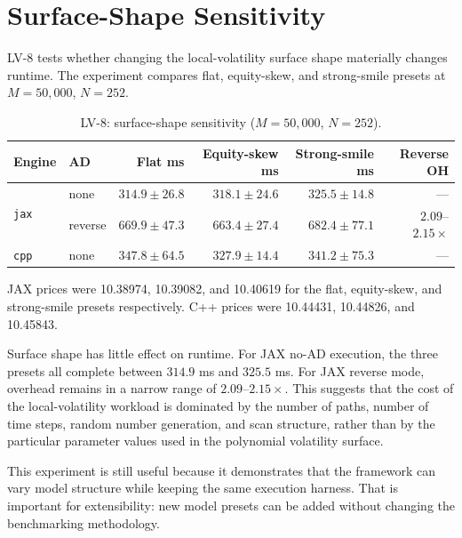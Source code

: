\section{Surface-Shape Sensitivity}
\label{sec:results-surface-sensitivity}

LV-8 tests whether changing the local-volatility surface shape materially
changes runtime.  The experiment compares flat, equity-skew, and
strong-smile presets at \(M=50{,}000\), \(N=252\).

\begin{table}[htbp]
\centering
\small
\begin{threeparttable}
\caption{LV-8: surface-shape sensitivity (\(M=50{,}000\), \(N=252\)).}
\label{tab:lv8-surface-sensitivity}
\begin{tabular}{llrrrr}
\toprule
\textbf{Engine}
& \textbf{AD}
& \textbf{Flat ms}
& \textbf{Equity-skew ms}
& \textbf{Strong-smile ms}
& \textbf{Reverse OH} \\
\midrule
\multirow{2}{*}{\texttt{jax}}
& none
& \(314.9\pm26.8\)
& \(318.1\pm24.6\)
& \(325.5\pm14.8\)
& --- \\
& reverse
& \(669.9\pm47.3\)
& \(663.4\pm27.4\)
& \(682.4\pm77.1\)
& \(2.09\)--\(2.15\times\) \\
\midrule
\texttt{cpp}
& none
& \(347.8\pm64.5\)
& \(327.9\pm14.4\)
& \(341.2\pm75.3\)
& --- \\
\bottomrule
\end{tabular}
\begin{tablenotes}
\footnotesize
\item JAX prices were 10.38974, 10.39082, and 10.40619 for the flat,
equity-skew, and strong-smile presets respectively.  C++ prices were
10.44431, 10.44826, and 10.45843.
\end{tablenotes}
\end{threeparttable}
\end{table}

Surface shape has little effect on runtime.  For JAX no-AD execution, the
three presets all complete between \(314.9\) ms and \(325.5\) ms.  For JAX
reverse mode, overhead remains in a narrow range of \(2.09\)--\(2.15\times\).
This suggests that the cost of the local-volatility workload is dominated by
the number of paths, number of time steps, random number generation, and scan
structure, rather than by the particular parameter values used in the
polynomial volatility surface.

This experiment is still useful because it demonstrates that the framework
can vary model structure while keeping the same execution harness.  That is
important for extensibility: new model presets can be added without changing
the benchmarking methodology.


